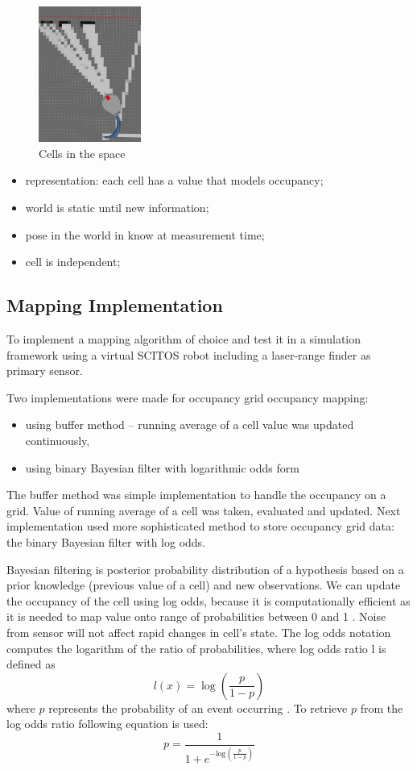 \documentclass{article}
\begin{document}
\begin{figure}
\centering
\includegraphics[width=0.3\textwidth]{laser.jpg}
\caption{\label{fig:laser}Cells in the space}
\end{figure}

\begin{itemize}
\item representation: each cell has a value that models occupancy;
\item world is static until new information;
\item pose in the world in know at measurement time;
\item cell is independent;
\end{itemize}

\subsection{Mapping Implementation}
To implement a mapping algorithm of choice and test it in a simulation framework using a virtual SCITOS robot including a laser-range finder as primary sensor.\newline

Two implementations were made for occupancy grid occupancy mapping:
\begin{itemize}
\item using buffer method -- running average of a cell value was updated continuously,
\item using binary Bayesian filter with logarithmic odds form
\end{itemize}

The buffer method was simple implementation to handle the occupancy on a grid. Value of running average of a cell was taken, evaluated and updated. Next implementation used more sophisticated method to store occupancy grid data: the binary Bayesian filter with log odds. \newline

Bayesian filtering is posterior probability distribution of a hypothesis based on a prior knowledge (previous value of a cell) and new observations. We can update the occupancy of the cell using log odds, because it is computationally efficient as it is needed to map value onto range of probabilities between 0 and 1 \cite{test}. Noise from sensor will not affect rapid changes in cell's state. The log odds notation computes the logarithm of the ratio of probabilities, where log odds ratio l is defined as
\[l(x) = \log\left(\frac{p}{1-p}\right)\]
where $p$ represents the probability of an event occurring \cite{lo}. To retrieve $p$ from the log odds ratio following equation is used:
\[p = \frac{1}{1+e^{-\text{log}\left(\frac{p}{1-p}\right)}}\]
\end{document}
